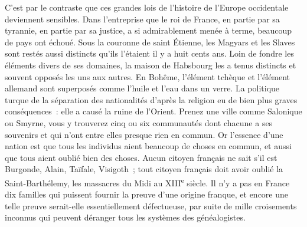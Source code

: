 \documentclass[twoside]{book} %
\newcommand\orgName[1]{#1}
\newcommand\persName[1]{#1}
\newcommand\placeName[1]{#1}
\begin{document}
C’est par le contraste que ces grandes lois de l’histoire de l’{\placeName Europe occidentale} deviennent sensibles. Dans l’entreprise que le {\persName roi de France}, en partie par sa tyrannie, en partie par sa justice, a si admirablement menée à terme, beaucoup de pays ont échoué. Sous la couronne de saint Étienne, les {\orgName Magyars} et les {\orgName Slaves} sont restés aussi distincts qu’ils l’étaient il y a huit cents ans. Loin de fondre les éléments divers de ses domaines, la {\orgName maison de Habsbourg} les a tenus distincts et souvent opposés les uns aux autres. En {\placeName Bohême}, l’élément tchèque et l’élément allemand sont superposés comme l’huile et l’eau dans un verre. La politique turque de la séparation des nationalités d’après la religion eu de bien plus graves conséquences : elle a causé la ruine de l’{\orgName Orient}. Prenez une ville comme {\placeName Salonique} ou {\placeName Smyrne}, vous y trouverez cinq ou six communautés dont chacune a ses souvenirs et qui n’ont entre elles presque rien en commun. Or l’essence d’une nation est que tous les individus aient beaucoup de choses en commun, et aussi que tous aient oublié bien des choses. Aucun citoyen français ne sait s’il est Burgonde, Alain, Taïfale, Visigoth ; tout citoyen français doit avoir oublié la Saint-Barthélemy, les massacres du {\placeName Midi} au XIII\textsuperscript{e} siècle. Il n’y a pas en {\placeName France} dix familles qui puissent fournir la preuve d’une origine franque, et encore une telle preuve serait-elle essentiellement défectueuse, par suite de mille croisements inconnus qui peuvent déranger tous les systèmes des généalogistes.\par
\end{document}
